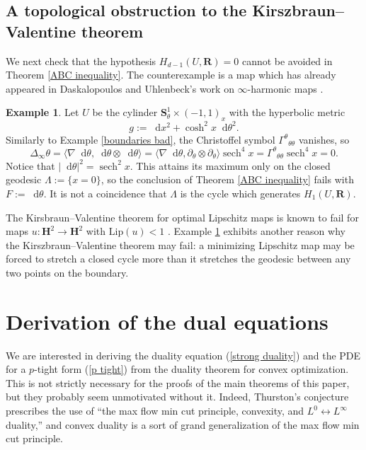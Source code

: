 \documentclass[reqno,11pt]{amsart}
\newcommand{\RR}{\mathbf{R}}
\newcommand{\Hyp}{\mathbf H}
\newcommand{\Sph}{\mathbf S}
\newcommand*\dif{\mathop{}\!\mathrm{d}}
\DeclareMathOperator{\sech}{sech}
\newcommand{\Lip}{\mathrm{Lip}}
\theoremstyle{definition}
\newtheorem{example}[theorem]{Example}
\numberwithin{equation}{section}
\begin{document}
\subsection{A topological obstruction to the Kirszbraun--Valentine theorem}
We next check that the hypothesis $H_{d - 1}(U, \RR) = 0$ cannot be avoided in Theorem \ref{ABC inequality}.
The counterexample is a map which has already appeared in Daskalopoulos and Uhlenbeck's work on $\infty$-harmonic maps \cite[\S8]{daskalopoulos2022}.

\begin{example}\label{exactness needed}
Let $U$ be the cylinder $\Sph^1_\theta \times (-1, 1)_x$ with the hyperbolic metric
$$g := \dif x^2 + \cosh^2 x \dif \theta^2.$$
Similarly to Example \ref{boundaries bad}, the Christoffel symbol ${\Gamma^\theta}_{\theta \theta}$ vanishes, so
$$\Delta_\infty \theta = \langle \nabla \dif \theta, \dif \theta \otimes \dif \theta\rangle = \langle \nabla \dif \theta, \partial_\theta \otimes \partial_\theta \rangle \sech^4 x =  {\Gamma^\theta}_{\theta \theta} \sech^4 x = 0.$$
Notice that $|\dif \theta|^2 = \sech^2 x$.
This attains its maximum only on the closed geodesic $\Lambda := \{x = 0\}$, so the conclusion of Theorem \ref{ABC inequality} fails with $F := \dif \theta$.
It is not a coincidence that $\Lambda$ is the cycle which generates $H_1(U, \RR)$.
\end{example}

The Kirsbraun--Valentine theorem for optimal Lipschitz maps is known to fail for maps $u: \Hyp^2 \to \Hyp^2$ with $\Lip(u) < 1$ \cite[Example 9.6]{Gu_ritaud_2017}.
Example \ref{exactness needed} exhibits another reason why the Kirszbraun--Valentine theorem may fail: a minimizing Lipschitz map may be forced to stretch a closed cycle more than it stretches the geodesic between any two points on the boundary.

\section{Derivation of the dual equations}\label{duality derivation}
We are interested in deriving the duality equation (\ref{strong duality}) and the PDE for a $p$-tight form (\ref{p tight}) from the duality theorem for convex optimization.
This is not strictly necessary for the proofs of the main theorems of this paper, but they probably seem unmotivated without it.
Indeed, Thurston's conjecture prescribes the use of ``the max flow min cut principle, convexity, and $L^0 \leftrightarrow L^\infty$ duality,'' and convex duality is a sort of grand generalization of the max flow min cut principle.
\end{document}
